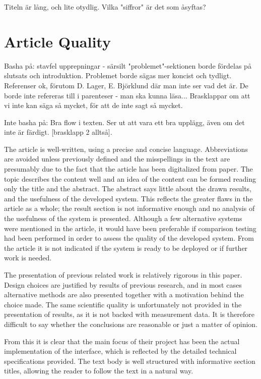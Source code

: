 \documentclass[a4paper,10pt]{article}
\begin{document}
Titeln är lång, och lite otydlig. Vilka "siffror" är det som åsyftas?


\section{Article Quality}
Basha på:
stavfel
upprepningar - särsilt "problemet"-sektionen borde fördelas på slutsats och introduktion. Problemet borde sägas mer koncist och tydligt.
Referenser ok, förutom D. Lager, E. Björklund där man inte ser vad det är. De borde inte refereras till i parenteser - man ska kunna läsa...
Brasklappar om att vi inte kan säga så mycket, för att de inte sagt så mycket.


Inte basha på:
Bra flow i texten.
Ser ut att vara ett bra upplägg, även om det inte är färdigt. [brasklapp 2 alltså].

The article is well-written, using a precise and concise language. Abbreviations are avoided unless previously defined and the misspellings in the text are presumably due to the fact that the article has been digitalized from paper. The topic describes the content well and an idea of the content can be formed reading only the title and the abstract. The abstract says little about the drawn results, and the usefulness of the developed system. This reflects the greater flaws in the article as a whole; the result section is not informative enough and no analysis of the usefulness of the system is presented. Although a few alternative systems were mentioned in the article, it would have been preferable if comparison testing had been performed in order to assess the quality of the developed system. From the article it is not indicated if the system is ready to be deployed or if further work is needed.

The presentation of previous related work is relatively rigorous in this paper. Design choices are justified by results of previous research, and in most cases alternative methods are also presented together with a motivation behind the choice made. The same scientific quality is unfortunately not provided in the presentation of results, as it is not backed with measurement data. It is therefore difficult to say whether the conclusions are reasonable or just a matter of opinion.


From this it is clear that the main focus of their project has been the actual implementation of the interface, which is reflected by the detailed technical specifications provided. The text body is well structured with informative section titles, allowing the reader to follow the text in a natural way. 
\end{document}
